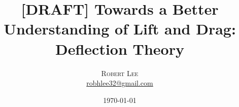 \setlength{\droptitle}{-4\baselineskip} %

\pretitle{\begin{center}\Huge\bfseries} %
\posttitle{\end{center}} %
\title{[DRAFT] Towards a Better Understanding of Lift and Drag: Deflection Theory} %
\author{%
\textsc{Robert Lee} \\[1ex] %
\normalsize \href{mailto:robhlee32@gmail.com}{robhlee32@gmail.com} %
}
\date{\today} %
\renewcommand{\maketitlehookd}{%



}
